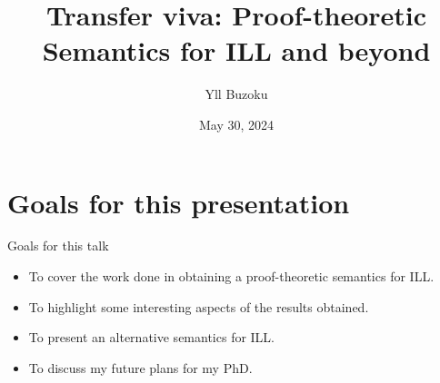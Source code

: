 \documentclass{beamer}
\title[P-tS for ILL]{Transfer viva: \newline Proof-theoretic Semantics for ILL and beyond}
\author{Yll Buzoku}
\institute[UCL]{%
  Department of Computer Science \\ %
  University College London
}
\date{May 30, 2024}
\begin{document}
\begin{frame}
\titlepage
\end{frame}
\section*{Goals for this presentation}
\begin{frame}{Goals for this talk}
\begin{itemize}
\item To cover the work done in obtaining a proof-theoretic semantics for ILL.
\item To highlight some interesting aspects of the results obtained.
\item To present an alternative semantics for ILL.
\item To discuss my future plans for my PhD.
\end{itemize}
\end{frame}
\end{document}
